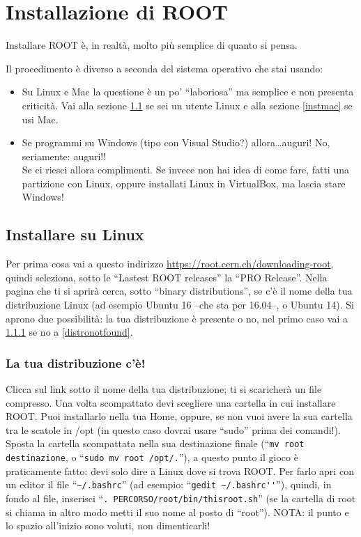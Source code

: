 \chapter{Installazione di ROOT}\label{instroot}
Installare ROOT è, in realtà, molto più semplice di quanto si pensa. 

Il procedimento è diverso a seconda del sistema operativo che stai usando:
\begin{itemize}
	\item Su Linux e Mac la questione è un po' ``laboriosa'' ma semplice e non presenta criticità. Vai alla sezione \ref{instlin} se sei un utente Linux e alla sezione \ref{instmac} se usi Mac.
	\item Se programmi su Windows (tipo con Visual Studio?) allora\ldots auguri! No, seriamente: auguri!! \\
	Se ci riesci allora complimenti. Se invece non hai idea di come fare, fatti una partizione con Linux, oppure installati Linux in VirtualBox, ma lascia stare Windows!
\end{itemize}

\section{Installare su Linux}\label{instlin}
Per prima cosa vai a questo indirizzo \url{https://root.cern.ch/downloading-root}, quindi seleziona, sotto le ``Lastest ROOT releases'' la ``PRO Release''. Nella pagina che ti si aprirà cerca, sotto ``binary distributions'', se c'è il nome della tua distribuzione Linux (ad esempio Ubuntu 16 --che sta per 16.04--, o Ubuntu 14). Si aprono due possibilità: la tua distribuzione è presente o no, nel primo caso vai a \ref{distrofound} se no a \ref{distronotfound}. 
\subsection{La tua distribuzione c'è!}\label{distrofound}
Clicca sul link sotto il nome della tua distribuzione; ti si scaricherà un file compresso. Una volta scompattato devi scegliere una cartella in cui installare ROOT. Puoi installarlo nella tua Home, oppure, se non vuoi avere la sua cartella tra le scatole in /opt (in questo caso dovrai usare ``sudo'' prima dei comandi!). Sposta la cartella scompattata nella sua destinazione finale (``\verb|mv root destinazione|, o ``\verb|sudo mv root /opt/.|''), a questo punto il gioco è praticamente fatto: devi solo dire a Linux dove si trova ROOT. Per farlo apri con un editor il file ``\verb|~/.bashrc|'' (ad esempio: ``\verb|gedit ~/.bashrc''|''), quindi, in fondo al file, inserisci ``\verb|. PERCORSO/root/bin/thisroot.sh|'' (se la cartella di root si chiama in altro modo metti il suo nome al posto di ``root''). NOTA: il punto e lo spazio all'inizio sono voluti, non dimenticarli!

